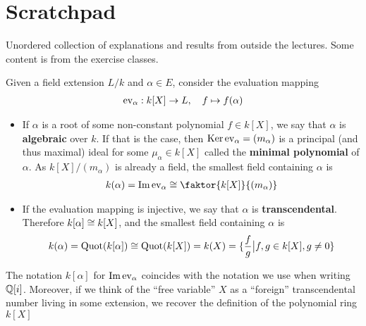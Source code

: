 \section{Scratchpad}
Unordered collection of explanations and results from outside the lectures.
Some content is from the exercise classes.

Given a field extension $L/k$ and $\alpha \in E$, consider the evaluation mapping
\begin{align*}
  \operatorname{ev}_{\alpha}: k[X] \to L, \quad f \mapsto f(\alpha)
\end{align*}

\begin{itemize}
  \item If $\alpha$ is a root of some non-constant polynomial $f \in k[X]$, we say that $\alpha$ is \textbf{algebraic} over $k$.
    If that is the case, then $\operatorname{Ker} \operatorname{ev}_{\alpha} = (m_{\alpha})$ is a principal (and thus maximal) ideal for some $\mu_{\alpha} \in k[X]$ called the \textbf{minimal polynomial} of $\alpha$.
    As $k[X]/(m_{\alpha})$ is already a field, the smallest field containing $\alpha$ is
    \begin{align*}
      k(\alpha) = \Image \ev_{\alpha} \iso \faktor{k[X]}{(m_{\alpha})}
    \end{align*}
  \item If the evaluation mapping is injective, we say that $\alpha$ is \textbf{transcendental}.
    Therefore $k[\alpha] \cong k[X]$, and the smallest field containing $\alpha$ is
    \begin{align*}
      k(\alpha) = \text{Quot}(k[\alpha]) \cong \text{Quot}(k[X]) = k(X) = \{\frac{f}{g} \big\vert f,g \in k[X], g \neq 0\}
    \end{align*}
\end{itemize}

The notation $k[\alpha]$ for $\operatorname{Im} \operatorname{ev}_{\alpha}$ coincides with the notation we use when writing $\mathbb{Q}[i]$.
Moreover, if we think of the ``free variable'' $X$ as a ``foreign'' transcendental number living in some extension, we recover the definition of the polynomial ring $k[X]$



